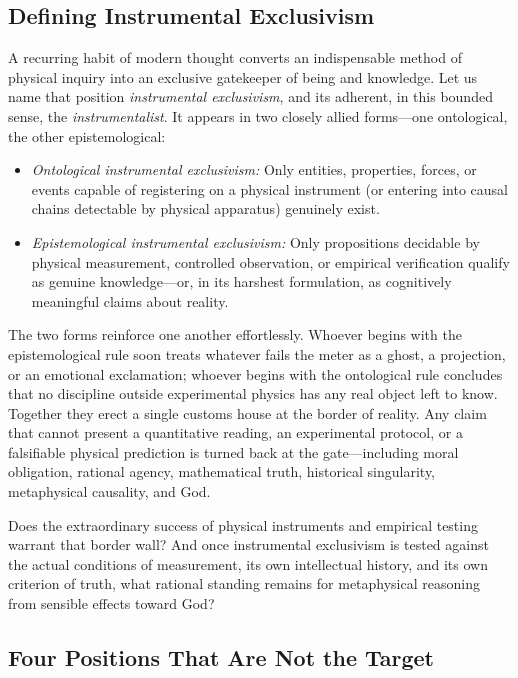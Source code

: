 \subsection{Defining Instrumental Exclusivism}

A recurring habit of modern thought converts an indispensable method of physical inquiry into an exclusive gatekeeper of being and knowledge. Let us name that position \emph{instrumental exclusivism}, and its adherent, in this bounded sense, the \emph{instrumentalist}. It appears in two closely allied forms---one ontological, the other epistemological:

\begin{itemize}
\item \emph{Ontological instrumental exclusivism:} Only entities, properties, forces, or events capable of registering on a physical instrument (or entering into causal chains detectable by physical apparatus) genuinely exist.
\item \emph{Epistemological instrumental exclusivism:} Only propositions decidable by physical measurement, controlled observation, or empirical verification qualify as genuine knowledge---or, in its harshest formulation, as cognitively meaningful claims about reality.
\end{itemize}

The two forms reinforce one another effortlessly. Whoever begins with the epistemological rule soon treats whatever fails the meter as a ghost, a projection, or an emotional exclamation; whoever begins with the ontological rule concludes that no discipline outside experimental physics has any real object left to know. Together they erect a single customs house at the border of reality. Any claim that cannot present a quantitative reading, an experimental protocol, or a falsifiable physical prediction is turned back at the gate---including moral obligation, rational agency, mathematical truth, historical singularity, metaphysical causality, and God.

Does the extraordinary success of physical instruments and empirical testing warrant that border wall? And once instrumental exclusivism is tested against the actual conditions of measurement, its own intellectual history, and its own criterion of truth, what rational standing remains for metaphysical reasoning from sensible effects toward God?

\subsection{Four Positions That Are Not the Target}

